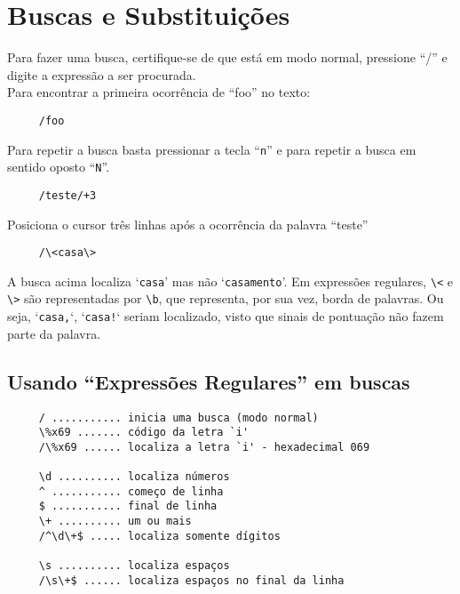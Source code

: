 
\chapter{Buscas e Substituições}\label{Buscas e substituições}

Para fazer uma busca, certifique-se de que está em modo normal,
pressione ``/'' e digite a expressão a ser procurada. \\


Para encontrar a primeira ocorrência de ``foo'' no texto:

\begin{verbatim}
     /foo
\end{verbatim}

Para repetir a busca basta pressionar a tecla ``\verb+n+'' e para
repetir a busca em sentido oposto ``\verb+N+''.

\begin{verbatim}
     /teste/+3
\end{verbatim}

Posiciona o cursor três linhas após a ocorrência da palavra ``teste'' \\

\begin{verbatim}
     /\<casa\>
\end{verbatim}

A busca acima localiza `{\tt casa}' mas não `{\tt casamento}'. Em expressões
regulares, \verb|\<| e \verb|\>| são representadas por \verb|\b|, que representa, por sua vez, borda
de palavras. Ou seja, `{\tt casa,}`, `{\tt casa!}` seriam localizado, visto que sinais
de pontuação não fazem parte da palavra.


\section{Usando ``Expressões Regulares'' em buscas}

\begin{verbatim}
     / ........... inicia uma busca (modo normal)
     \%x69 ....... código da letra `i'
     /\%x69 ...... localiza a letra `i' - hexadecimal 069

     \d .......... localiza números
     ^ ........... começo de linha
     $ ........... final de linha
     \+ .......... um ou mais
     /^\d\+$ ..... localiza somente dígitos

     \s .......... localiza espaços
     /\s\+$ ...... localiza espaços no final da linha
\end{verbatim}

